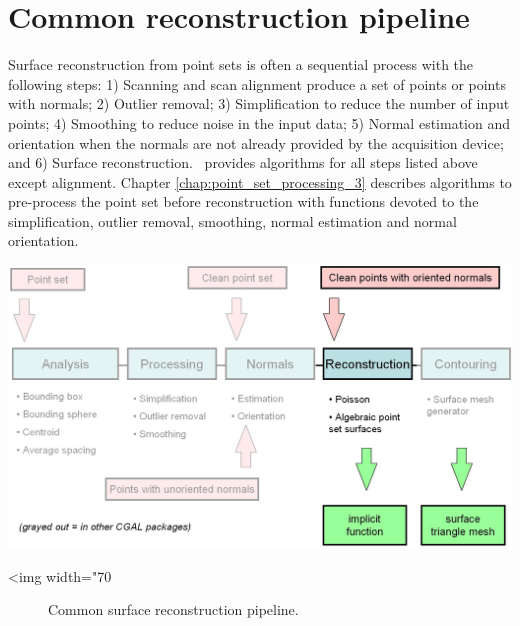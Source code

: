\section{Common reconstruction pipeline}

Surface reconstruction from point sets is often a sequential process with the following steps: 1) Scanning and scan alignment produce a set of points or points with normals; 2) Outlier removal; 3) Simplification to reduce the number of input points; 4) Smoothing to reduce noise in the input data; 5) Normal estimation and orientation when the normals are not already provided by the acquisition device; and 6) Surface reconstruction. \cgal\ provides algorithms for all steps listed above except alignment. Chapter  \ref{chap:point_set_processing_3} describes algorithms to pre-process the point set before reconstruction with functions devoted to the simplification, outlier removal, smoothing, normal estimation and normal orientation.

\begin{center}
    \label{Surface_reconstruction_points_3-fig-pipeline}
    \begin{ccTexOnly}
        \includegraphics[width=1.0\textwidth]{Surface_reconstruction_points_3/pipeline} %
    \end{ccTexOnly}
    \begin{ccHtmlOnly}
        <img width="70%
    \end{ccHtmlOnly}
    \begin{figure}[h]
        \caption{Common surface reconstruction pipeline.}
    \end{figure}
\end{center}


